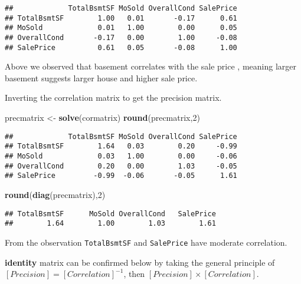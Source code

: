\documentclass[]{article}
\newenvironment{Shaded}{\begin{snugshade}}{\end{snugshade}}
\newcommand{\DecValTok}[1]{\textcolor[rgb]{0.00,0.00,0.81}{#1}}
\newcommand{\KeywordTok}[1]{\textcolor[rgb]{0.13,0.29,0.53}{\textbf{#1}}}
\newcommand{\NormalTok}[1]{#1}
\newcommand{\OperatorTok}[1]{\textcolor[rgb]{0.81,0.36,0.00}{\textbf{#1}}}
\newcommand{\StringTok}[1]{\textcolor[rgb]{0.31,0.60,0.02}{#1}}
\begin{document}
\begin{verbatim}
##             TotalBsmtSF MoSold OverallCond SalePrice
## TotalBsmtSF        1.00   0.01       -0.17      0.61
## MoSold             0.01   1.00        0.00      0.05
## OverallCond       -0.17   0.00        1.00     -0.08
## SalePrice          0.61   0.05       -0.08      1.00
\end{verbatim}

Above we observed that basement correlates with the sale price , meaning
larger basement suggests larger house and higher sale price.

Inverting the correlation matrix to get the precision matrix.

\begin{Shaded}
\begin{Highlighting}[]
\NormalTok{precmatrix <-}\StringTok{ }\KeywordTok{solve}\NormalTok{(cormatrix)}
\KeywordTok{round}\NormalTok{(precmatrix,}\DecValTok{2}\NormalTok{)}
\end{Highlighting}
\end{Shaded}

\begin{verbatim}
##             TotalBsmtSF MoSold OverallCond SalePrice
## TotalBsmtSF        1.64   0.03        0.20     -0.99
## MoSold             0.03   1.00        0.00     -0.06
## OverallCond        0.20   0.00        1.03     -0.05
## SalePrice         -0.99  -0.06       -0.05      1.61
\end{verbatim}

\begin{Shaded}
\begin{Highlighting}[]
\KeywordTok{round}\NormalTok{(}\KeywordTok{diag}\NormalTok{(precmatrix),}\DecValTok{2}\NormalTok{)}
\end{Highlighting}
\end{Shaded}

\begin{verbatim}
## TotalBsmtSF      MoSold OverallCond   SalePrice 
##        1.64        1.00        1.03        1.61
\end{verbatim}

From the observation \texttt{TotalBsmtSF} and \texttt{SalePrice} have
moderate correlation.

\textbf{identity} matrix can be confirmed below by taking the general
principle of \([Precision] = [Correlation]^{-1}\), then
\([Precision]\times[Correlation]\).

\begin{Shaded}
\end{Shaded}
\end{document}
